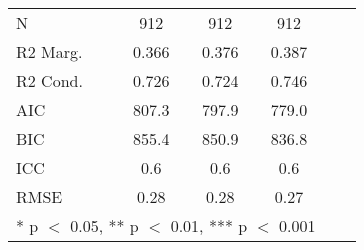 \begin{tabular}[t]{lccccc}
\midrule
N                                & \num{912}      & \num{912}      & \num{912}      \\
R2 Marg.                                & \num{0.366}    & \num{0.376}    & \num{0.387}    \\
R2 Cond.                                & \num{0.726}    & \num{0.724}    & \num{0.746}    \\
AIC                                     & \num{807.3}    & \num{797.9}    & \num{779.0}    \\
BIC                                     & \num{855.4}    & \num{850.9}    & \num{836.8}    \\
ICC                                     & \num{0.6}      & \num{0.6}      & \num{0.6}      \\
RMSE                                    & \num{0.28}     & \num{0.28}     & \num{0.27}     \\
\bottomrule
\multicolumn{4}{l}{\rule{0pt}{1em}* p $<$ 0.05, ** p $<$ 0.01, *** p $<$ 0.001}\\
\end{tabular}
